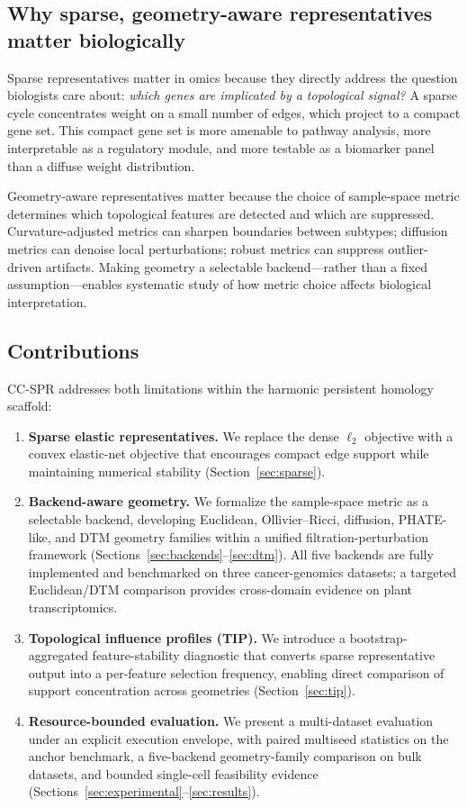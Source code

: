 \documentclass[11pt]{article}
\begin{document}
\subsection{Why sparse, geometry-aware representatives matter biologically}

Sparse representatives matter in omics because they directly address the question biologists care about: \emph{which genes are implicated by a topological signal?}
A sparse cycle concentrates weight on a small number of edges, which project to a compact gene set.
This compact gene set is more amenable to pathway analysis, more interpretable as a regulatory module, and more testable as a biomarker panel than a diffuse weight distribution.

Geometry-aware representatives matter because the choice of sample-space metric determines which topological features are detected and which are suppressed.
Curvature-adjusted metrics can sharpen boundaries between subtypes; diffusion metrics can denoise local perturbations; robust metrics can suppress outlier-driven artifacts.
Making geometry a selectable backend---rather than a fixed assumption---enables systematic study of how metric choice affects biological interpretation.

\subsection{Contributions}

CC-SPR addresses both limitations within the harmonic persistent homology scaffold:
\begin{enumerate}[leftmargin=1.5em]
\item \textbf{Sparse elastic representatives.} We replace the dense $\ell_2$ objective with a convex elastic-net objective that encourages compact edge support while maintaining numerical stability (Section~\ref{sec:sparse}).
\item \textbf{Backend-aware geometry.} We formalize the sample-space metric as a selectable backend, developing Euclidean, Ollivier--Ricci, diffusion, PHATE-like, and DTM geometry families within a unified filtration-perturbation framework (Sections~\ref{sec:backends}--\ref{sec:dtm}).
All five backends are fully implemented and benchmarked on three cancer-genomics datasets; a targeted Euclidean/DTM comparison provides cross-domain evidence on plant transcriptomics.
\item \textbf{Topological influence profiles (TIP).} We introduce a bootstrap-aggregated feature-stability diagnostic that converts sparse representative output into a per-feature selection frequency, enabling direct comparison of support concentration across geometries (Section~\ref{sec:tip}).
\item \textbf{Resource-bounded evaluation.} We present a multi-dataset evaluation under an explicit execution envelope, with paired multiseed statistics on the anchor benchmark, a five-backend geometry-family comparison on bulk datasets, and bounded single-cell feasibility evidence (Sections~\ref{sec:experimental}--\ref{sec:results}).
\end{enumerate}
\end{document}
